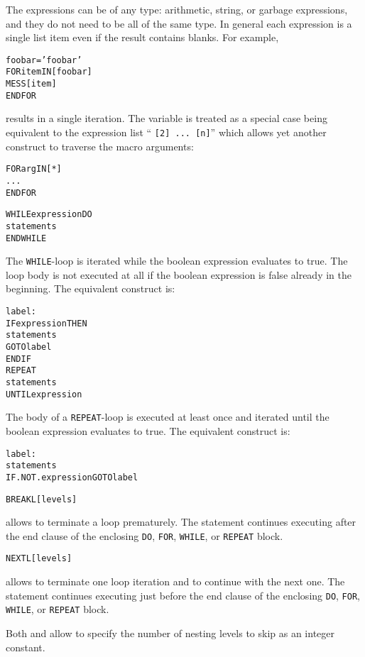 The expressions can be of any type: arithmetic, string, or garbage
expressions, and they do not need to be all of the same type.
In general each expression is a single list item even if the result
contains blanks.
For example,
\begin{alltt}
foobar = 'foo bar'
FOR item IN [foobar]
   MESS [item]
ENDFOR
\end{alltt}
results in a single iteration.
The variable \MacVar{*} is treated as a special case being 
equivalent to the expression list `` \texttt{[2] ... [n]}''
which allows yet another construct to traverse the macro arguments:
\begin{alltt}
FOR arg IN [*]
   ...
ENDFOR
\end{alltt}

\begin{alltt}
WHILE expression DO
   statements
ENDWHILE
\end{alltt}
\label{ref:WHILE}
The \texttt{WHILE}-loop is iterated while the boolean expression
evaluates to true.
The loop body is not executed at all if the boolean expression is
false already in the beginning.
The equivalent construct is:
\begin{alltt}
label:
IF expression THEN
   statements
   GOTO label
ENDIF
REPEAT
   statements
UNTIL expression
\end{alltt}
\label{ref:REPEAT}
The body of a \texttt{REPEAT}-loop is executed at least once and iterated
until the boolean expression evaluates to true.
The equivalent construct is:
\begin{alltt}
label:
   statements
IF .NOT. expression GOTO label
\end{alltt}

 
\label{ref:BREAKL}

\begin{alltt}
BREAKL  [ levels ]
\end{alltt}
allows to terminate a loop prematurely.
The  statement continues executing after the end clause of the
enclosing \texttt{DO}, \texttt{FOR}, \texttt{WHILE}, or \texttt{REPEAT} block.

\begin{alltt}
NEXTL  [ levels ]
\end{alltt}
allows to terminate one loop iteration and to continue with the next one.
The  statement continues executing just before the end
clause of the enclosing \texttt{DO}, \texttt{FOR}, \texttt{WHILE}, or
\texttt{REPEAT} block. 

Both  and  allow to specify the number of
nesting levels to skip as an integer constant.

